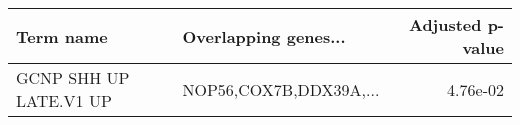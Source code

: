 \begin{tabular}{llr}
\toprule
             Term name &   Overlapping genes... &  Adjusted p-value \\
\midrule
GCNP SHH UP LATE.V1 UP & NOP56,COX7B,DDX39A,... &          4.76e-02 \\
\bottomrule
\end{tabular}
